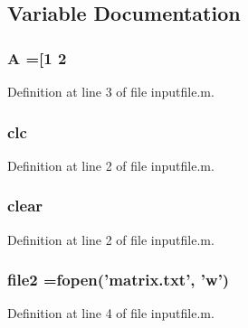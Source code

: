 \subsection{Variable Documentation}
\subsubsection[{A}]{\setlength{\rightskip}{0pt plus 5cm}A =[1 2}\label{inputfile_8m_a3b98e2dffc6cb06a89dcb0d5c60a0206}


Definition at line 3 of file inputfile.\-m.

\subsubsection[{clc}]{\setlength{\rightskip}{0pt plus 5cm}clc}\label{inputfile_8m_a3f3d3b13a15c726d6aa03db3dd0d6377}


Definition at line 2 of file inputfile.\-m.

\subsubsection[{clear}]{\setlength{\rightskip}{0pt plus 5cm}clear}\label{inputfile_8m_aebfdce4f6cc7241ba38924f77a12e7cf}


Definition at line 2 of file inputfile.\-m.

\subsubsection[{file2}]{\setlength{\rightskip}{0pt plus 5cm}file2 =fopen('matrix.\-txt', 'w')}\label{inputfile_8m_a1858d01a8d84806c9998f8ec81e9b774}


Definition at line 4 of file inputfile.\-m.

